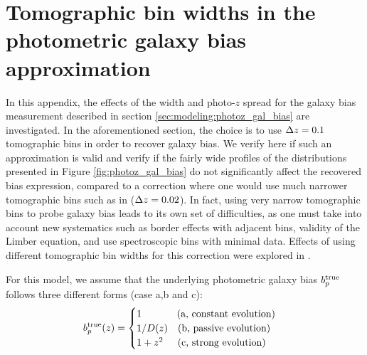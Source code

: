 \section{Tomographic bin widths in the photometric galaxy bias approximation} \label{sec:appendix_pz}
In this appendix, the effects of the width and photo-$z$ spread for the galaxy bias measurement described in section \ref{sec:modeling:photoz_gal_bias} are investigated. 
In the aforementioned section, the choice is to use $\Delta z=0.1$ tomographic bins in order to recover galaxy bias.
We verify here if such an approximation is valid and verify if the fairly wide profiles of the distributions presented in Figure \ref{fig:photoz_gal_bias} do not significantly affect the recovered bias expression, compared to a correction where one would use much narrower tomographic bins such as in \cite{Cawthon2022DESY3Boss} ($\Delta z=0.02$). 
In fact, using very narrow tomographic bins to probe galaxy bias leads to its own set of difficulties, as one must take into account new systematics such as border effects with adjacent bins, validity of the Limber equation, and use spectroscopic bins with minimal data.
Effects of using different tomographic bin widths for this correction were explored in \cite{EuclidClusterRedshifts2025}.

For this model, we assume that the underlying photometric galaxy bias $b_p^{\rm true}$ follows three different forms (case a,b and c): 
\begin{equation}\label{eq:app:bias_models}
b_p^{\rm true}(z)=
    \begin{cases}
        1\quad\quad\quad\;\;\text{(a, constant evolution)}\\ 1/D(z)\quad\text{(b, passive evolution)}\\ 1+z^2\quad\;\,\text{(c, strong evolution)}
    \end{cases}
\end{equation}

